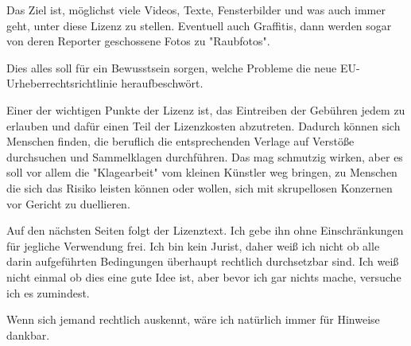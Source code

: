 \documentclass[a4paper,8pt]{extarticle}
\begin{document}
Das Ziel ist, möglichst viele Videos, Texte, Fensterbilder und was auch immer geht, unter diese Lizenz zu stellen. Eventuell auch Graffitis, dann werden sogar von deren Reporter geschossene Fotos zu "Raubfotos".

Dies alles soll für ein Bewusstsein sorgen, welche Probleme die neue EU-Urheberrechtsrichtlinie heraufbeschwört.

Einer der wichtigen Punkte der Lizenz ist, das Eintreiben der Gebühren jedem zu erlauben und dafür einen Teil der Lizenzkosten abzutreten. Dadurch können sich Menschen finden, die beruflich die entsprechenden Verlage auf Verstöße durchsuchen und Sammelklagen durchführen. Das mag schmutzig wirken, aber es soll vor allem die "Klagearbeit" vom kleinen Künstler weg bringen, zu Menschen die sich das Risiko leisten können oder wollen, sich mit skrupellosen Konzernen vor Gericht zu duellieren.

Auf den nächsten Seiten folgt der Lizenztext. Ich gebe ihn ohne Einschränkungen für jegliche Verwendung frei. Ich bin kein Jurist, daher weiß ich nicht ob alle darin aufgeführten Bedingungen überhaupt rechtlich durchsetzbar sind. Ich weiß nicht einmal ob dies eine gute Idee ist, aber bevor ich gar nichts mache, versuche ich es zumindest.

Wenn sich jemand rechtlich auskennt, wäre ich natürlich immer für Hinweise dankbar.

\ 
\end{document}
